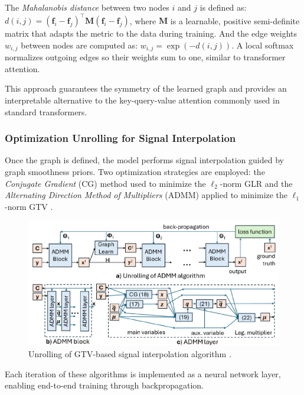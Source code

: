 \documentclass{article}
\theoremstyle{plain}
\theoremstyle{definition}
\theoremstyle{remark}
\begin{document}
The \textit{Mahalanobis distance} between two nodes $i$ and $j$ is defined as: $d(i, j) = (\mathbf{f}_i - \mathbf{f}_j)^\top \mathbf{M} (\mathbf{f}_i - \mathbf{f}_j)$, where $\mathbf{M}$ is a learnable, positive semi-definite matrix that adapts the metric to the data during training. And the edge weights $w_{i,j}$ between nodes are computed as: $w_{i,j} = \exp(-d(i,j)).$ A local softmax normalizes outgoing edges so their weights sum to one, similar to transformer attention.

This approach guarantees the symmetry of the learned graph and provides an interpretable alternative to the key-query-value attention commonly used in standard transformers.

\subsubsection{Optimization Unrolling for Signal Interpolation}

Once the graph is defined, the model performs signal interpolation guided by graph smoothness priors. Two optimization strategies are employed: the \textit{Conjugate Gradient} (CG) method used to minimize the $\ell_2$-norm GLR \cite{shewchuk1994introduction} and the \textit{Alternating Direction Method of Multipliers} (ADMM) applied to minimize the $\ell_1$-norm GTV \cite{wang2017new}.

\begin{figure}[ht]
\vskip -0.1in
\begin{center}
\centerline{\includegraphics[width=\columnwidth]{GTV-based_algorithm.png}}
\caption{Unrolling of GTV-based signal interpolation algorithm \cite{do2024interpretable}.}
\label{fig:unrolling-gtv}
\end{center}
\vskip -0.3in
\end{figure}

Each iteration of these algorithms is implemented as a neural network layer, enabling end-to-end training through backpropagation.
\end{document}
